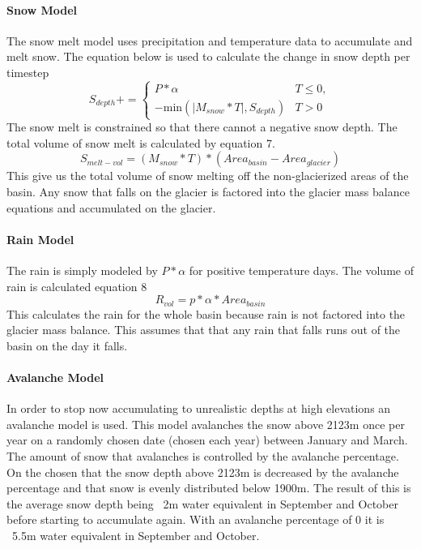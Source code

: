 \documentclass{article}
\begin{document}
\paragraph{Snow Model}
The snow melt model uses precipitation and temperature data to accumulate and melt snow. 
The equation below is used to calculate the change in snow depth per timestep 
\begin{equation}S_{depth} += 
\begin{cases} 
  P*\alpha & T \leq 0,\\
  -\text{min}(|M_{snow}*T|,S_{depth}) &  T > 0
\end{cases}\end{equation}
The snow melt is constrained so that there cannot a negative snow depth. 
The total volume of snow melt is calculated by equation 7.
\begin{equation}S_{melt-vol}=(M_{snow}*T)*({Area}_{basin}-{Area}_{glacier})\end{equation}
This give us the total volume of snow melting off the non-glacierized areas of the basin. Any snow that falls on the glacier is factored into 
the glacier mass balance equations and accumulated on the glacier.
\paragraph{Rain Model}
The rain is simply modeled by $P*\alpha$ for positive temperature days. The volume of rain is calculated equation 8
\begin{equation}R_{vol}=p*\alpha*{Area}_{basin}\end{equation}
This calculates the rain for the whole basin because rain is not factored into the glacier mass balance. This assumes that  that any rain 
that falls runs out of the basin on the day it falls.

\paragraph{Avalanche Model}
In order to stop now accumulating to unrealistic depths at high elevations an avalanche model is used. This model avalanches the 
snow above 2123m once per year on a randomly chosen date (chosen each year) between January and March. The amount of snow that 
avalanches is controlled by the avalanche percentage. On the chosen that the snow depth above 2123m is decreased by the avalanche 
percentage and that snow is evenly distributed below 1900m. The result of this is the average snow depth being ~2m water 
equivalent in September and October before starting to accumulate again. With an avalanche percentage of 0 it is ~5.5m water 
equivalent in September and October.  
\end{document}
